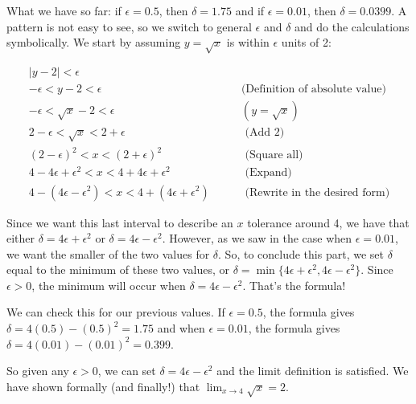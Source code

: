 {What we have so far: if $\epsilon =0.5$, then $\delta = 1.75$ and if $\epsilon =0.01$, then $\delta = 0.0399$. A pattern is not easy to see, so we switch to general $\epsilon$ and $\delta$ and do the calculations symbolically.  We start by assuming $y=\sqrt{x}$ is within $\epsilon$ units of 2:

\begin{eqnarray*}
|y - 2| < \epsilon &\\
-\epsilon < y - 2 < \epsilon& \qquad \textrm{(Definition of absolute value)}\\
-\epsilon < \sqrt{x} - 2 < \epsilon  &\qquad (y=\sqrt{x})\\
2 - \epsilon < \sqrt{x} < 2+ \epsilon &\qquad \textrm{ (Add 2)}\\
(2 - \epsilon)^2 < x < (2+ \epsilon) ^2 &\qquad \textrm{ (Square all)}\\
4 - 4\epsilon + \epsilon^2 < x < 4 + 4\epsilon + \epsilon^2 &\qquad \textrm{ (Expand)}\\
4 - (4\epsilon - \epsilon^2) < x < 4 + (4\epsilon + \epsilon^2) &\qquad \textrm{ (Rewrite in the desired form)}
\end{eqnarray*}

Since we want this last interval to describe an $x$ tolerance around 4, we have that either $\delta = 4\epsilon + \epsilon^2$ or $\delta = 4\epsilon - \epsilon^2$. However, as we saw in the case when $\epsilon = 0.01$, we want the smaller of the two values for $\delta$.  So, to conclude this part, we set
$\delta$ equal to the minimum of these two values, or $\delta = \min\{4\epsilon + \epsilon^2, 4\epsilon - \epsilon^2\}$.  Since $\epsilon > 0$, the minimum will occur when $\delta = 4\epsilon - \epsilon^2$.  That's the formula!  

We can check this for our previous values.  If $\epsilon=0.5$, the formula gives
$\delta = 4(0.5) - (0.5)^2 = 1.75$ and when $\epsilon=0.01$, the formula gives $\delta = 4(0.01) - (0.01)^2 = 0.399$.

So given any $\epsilon >0$, we can set $\delta = 4\epsilon - \epsilon^2$ and the limit definition is satisfied.  We have shown formally (and finally!) that $\displaystyle \lim_{x\rightarrow 4} \sqrt{x} = 2 $.
}\\

 
